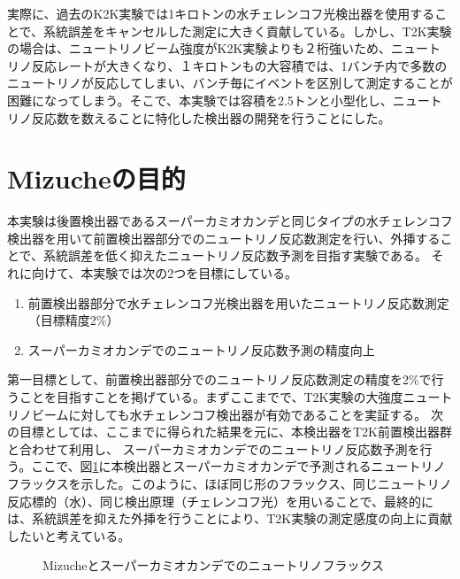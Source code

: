 \documentclass[11pt]{ltjsreport}
\newcommand{\figref}[1]{図\ref{#1}}
\begin{document}
実際に、過去のK2K実験では1キロトンの水チェレンコフ光検出器を使用することで、系統誤差をキャンセルした測定に大きく貢献している。しかし、T2K実験の場合は、ニュートリノビーム強度がK2K実験よりも２桁強いため、ニュートリノ反応レートが大きくなり、１キロトンもの大容積では、1バンチ内で多数のニュートリノが反応してしまい、バンチ毎にイベントを区別して測定することが困難になってしまう。そこで、本実験では容積を2.5トンと小型化し、ニュートリノ反応数を数えることに特化した検出器の開発を行うことにした。

\section{Mizucheの目的}

本実験は後置検出器であるスーパーカミオカンデと同じタイプの水チェレンコフ検出器を用いて前置検出器部分でのニュートリノ反応数測定を行い、外挿することで、系統誤差を低く抑えたニュートリノ反応数予測を目指す実験である。
それに向けて、本実験では次の2つを目標にしている。
\begin{enumerate}
\item 前置検出器部分で水チェレンコフ光検出器を用いたニュートリノ反応数測定\\（目標精度2\%）
\item スーパーカミオカンデでのニュートリノ反応数予測の精度向上
\end{enumerate}

第一目標として、前置検出器部分でのニュートリノ反応数測定の精度を2\%で行うことを目指すことを掲げている。まずここまでで、T2K実験の大強度ニュートリノビームに対しても水チェレンコフ検出器が有効であることを実証する。
次の目標としては、ここまでに得られた結果を元に、本検出器をT2K前置検出器群と合わせて利用し、
スーパーカミオカンデでのニュートリノ反応数予測を行う。ここで、\figref{MizuSKFlux}に本検出器とスーパーカミオカンデで予測されるニュートリノフラックスを示した。このように、ほぼ同じ形のフラックス、同じニュートリノ反応標的（水）、同じ検出原理（チェレンコフ光）を用いることで、最終的には、系統誤差を抑えた外挿を行うことにより、T2K実験の測定感度の向上に貢献したいと考えている。

\begin{figure}[htbp]
  \begin{minipage}{0.47\textwidth}
  \end{minipage}
  \hfill
  \begin{minipage}{0.47\textwidth}
  \end{minipage}
    \caption[Mizucheとスーパーカミオカンデでのニュートリノフラックス]{Mizucheとスーパーカミオカンデでのニュートリノフラックス}
  \label{MizuSKFlux}
\end{figure}
\end{document}
